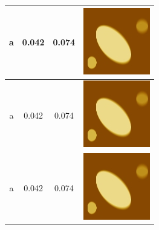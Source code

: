 \documentclass{procDDs}
\begin{document}
\begin{table}[!ht]
{\begin{tabular}{|c|c|c|c|}
			a &  0.042 &  0.074 & \includegraphics[width=0.2\linewidth]{img/7/1.jpg} \\ \hline
			a &  0.042 &  0.074 & \includegraphics[width=0.2\linewidth]{img/7/1.jpg} \\ \hline
			a &  0.042 &  0.074 & \includegraphics[width=0.2\linewidth]{img/7/1.jpg} \\ \hline
		\end{tabular}}	
	\end{table}
\end{document}
